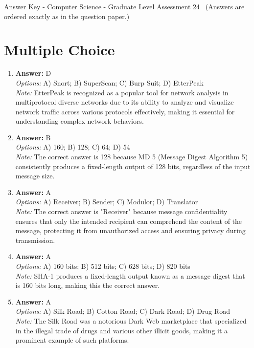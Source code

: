 \documentclass[12pt]{article}
\begin{document}
\begin{center}
Answer Key - Computer Science - Graduate Level Assessment 24 \
\small (Answers are ordered exactly as in the question paper.)
\end{center}

\section*{Multiple Choice}
\begin{enumerate}[label=\arabic*.]
\item \textbf{Answer:} D
\\ \textit{Options:} A) Snort; B) SuperScan; C) Burp Suit; D) EtterPeak
\\ \textit{Note:} EtterPeak is recognized as a popular tool for network analysis in multiprotocol diverse networks due to its ability to analyze and visualize network traffic across various protocols effectively, making it essential for understanding complex network behaviors.
\item \textbf{Answer:} B
\\ \textit{Options:} A) 160; B) 128; C) 64; D) 54
\\ \textit{Note:} The correct answer is 128 because MD 5 (Message Digest Algorithm 5) consistently produces a fixed-length output of 128 bits, regardless of the input message size.
\item \textbf{Answer:} A
\\ \textit{Options:} A) Receiver; B) Sender; C) Modulor; D) Translator
\\ \textit{Note:} The correct answer is "Receiver" because message confidentiality ensures that only the intended recipient can comprehend the content of the message, protecting it from unauthorized access and ensuring privacy during transmission.
\item \textbf{Answer:} A
\\ \textit{Options:} A) 160 bits; B) 512 bits; C) 628 bits; D) 820 bits
\\ \textit{Note:} SHA-1 produces a fixed-length output known as a message digest that is 160 bits long, making this the correct answer.
\item \textbf{Answer:} A
\\ \textit{Options:} A) Silk Road; B) Cotton Road; C) Dark Road; D) Drug Road
\\ \textit{Note:} The Silk Road was a notorious Dark Web marketplace that specialized in the illegal trade of drugs and various other illicit goods, making it a prominent example of such platforms.
\end{enumerate}
\end{document}
